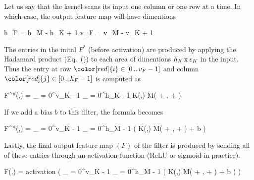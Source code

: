 Let us say that the kernel scans its input one column or one row at a time.
In which case, the output feature map will have dimentions

\startplaceformula[reference=dimen-feature-1]
\startformula
h_F = h_M - h_K + 1
\stopformula
\startformula
v_F = v_M - v_K + 1
\stopformula
\stopplaceformula

The entries in the inital $F^*$ (before activation) are produced by applying the Hadamard product (Eq.~(\in[hdprod])) to each area of dimentions $h_K\,{\rm x}\,v_K$ in the input.
Thus the entry at row $\color[red]{i} \in [0 \, .. \, v_F - 1]$ and column $\color[red]{j} \in [0 \, .. \, h_F - 1]$ is computed as

\startplaceformula[reference=devel-feature-1]
\startformula
F^*(\color[red]{i},\color[red]{j}) = \sum_{\color[blue]{i} = 0}^{v_K - 1} \sum_{\color[blue]{j} = 0}^{h_K - 1} K(\color[blue]{i},\color[blue]{j}) \cdot M(\color[red]{i} + \color[blue]{i}, \color[red]{j} + \color[blue]{j})
\stopformula
\stopplaceformula

If we add a bias $b$ to this filter, the formula becomes

\startplaceformula[reference=devel-feature-2]
\startformula
F^*(\color[red]{i},\color[red]{j}) = \sum_{\color[blue]{i} = 0}^{v_K - 1} \sum_{\color[blue]{j} = 0}^{h_M - 1} \Bigl( K(\color[blue]{i},\color[blue]{j}) \cdot M(\color[red]{i} + \color[blue]{i}, \color[red]{j} + \color[blue]{j}) + b \Bigr)
\stopformula
\stopplaceformula

Lastly, the final output feature map $(F)$ of the filter is produced by sending all of these entries through an activation function (ReLU or sigmoid in practice).

\startplaceformula[reference=devel-feature-3]
\startformula
F(\color[red]{i},\color[red]{j}) = {\rm activation} \left( \sum_{\color[blue]{i} = 0}^{v_K - 1} \sum_{\color[blue]{j} = 0}^{h_M - 1} \Bigl( K(\color[blue]{i},\color[blue]{j}) \cdot M(\color[red]{i} + \color[blue]{i}, \color[red]{j} + \color[blue]{j}) + b \Bigr) \right)
\stopformula
\stopplaceformula

\startplacefigure[reference=conv-operation,
                   title={The basic forward operation of a convolutional layer},
                   location=top]
{}{}
{}{}
{}{}
{}{}
{}{}
{}{}
{}{}
{}{}
\stopcombination
\stopplacefigure

